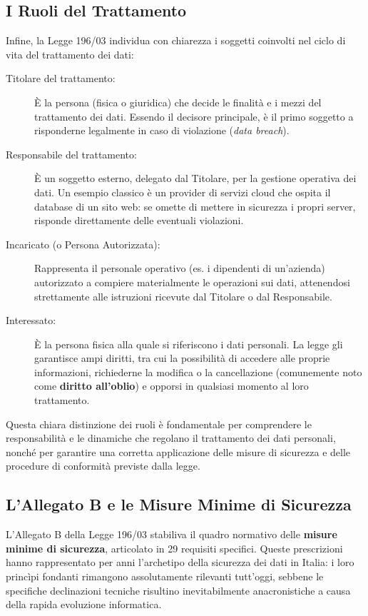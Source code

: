 \subsection*{I Ruoli del Trattamento}

Infine, la Legge 196/03 individua con chiarezza i soggetti coinvolti nel ciclo di vita del trattamento dei dati:

\begin{description}
    \item[Titolare del trattamento:] È la persona (fisica o giuridica) che decide le finalità e i mezzi del trattamento dei dati. Essendo il decisore principale, è il primo soggetto a risponderne legalmente in caso di violazione (\textit{data breach}).
    \item[Responsabile del trattamento:] È un soggetto esterno, delegato dal Titolare, per la gestione operativa dei dati. Un esempio classico è un provider di servizi cloud che ospita il database di un sito web: se omette di mettere in sicurezza i propri server, risponde direttamente delle eventuali violazioni.
    \item[Incaricato (o Persona Autorizzata):] Rappresenta il personale operativo (es. i dipendenti di un'azienda) autorizzato a compiere materialmente le operazioni sui dati, attenendosi strettamente alle istruzioni ricevute dal Titolare o dal Responsabile.
    \item[Interessato:] È la persona fisica alla quale si riferiscono i dati personali. La legge gli garantisce ampi diritti, tra cui la possibilità di accedere alle proprie informazioni, richiederne la modifica o la cancellazione (comunemente noto come \textbf{diritto all'oblio}) e opporsi in qualsiasi momento al loro trattamento.
\end{description}

Questa chiara distinzione dei ruoli è fondamentale per comprendere le responsabilità e le dinamiche che regolano il trattamento dei dati personali, nonché per garantire una corretta applicazione delle misure di sicurezza e delle procedure di conformità previste dalla legge.

\subsection{L'Allegato B e le Misure Minime di Sicurezza}

L'Allegato B della Legge 196/03 stabiliva il quadro normativo delle \textbf{misure minime di sicurezza}, articolato in 29 requisiti specifici. Queste prescrizioni hanno rappresentato per anni l'archetipo della sicurezza dei dati in Italia: i loro princìpi fondanti rimangono assolutamente rilevanti tutt'oggi, sebbene le specifiche declinazioni tecniche risultino inevitabilmente anacronistiche a causa della rapida evoluzione informatica.

